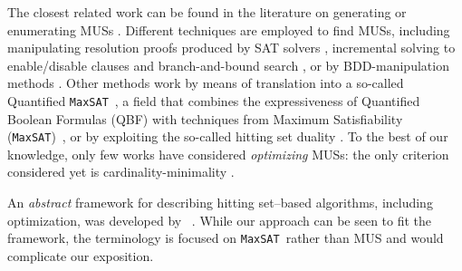 \documentclass[twoside,11pt]{article}
\newcommand\citet[1]{\citeauthor{#1}~\citeyear{#1}}
\newcommand\comment[1]{\marginpar{\tiny #1}}
\renewcommand\comment[1]{#1}
\newcommand{\emilio}[1]{{\comment{\color{red}Emilio: #1}}}
\newcommand\hitsetbased{hitting set--based\xspace} %
\newcommand\maxsat{\texttt{MaxSAT}}
\begin{document}
The closest related work can be found in the literature on generating or enumerating MUSs \cite{conf/sat/LynceM04,liffiton2016fast}.
Different techniques are employed to find MUSs, including  manipulating resolution proofs produced by SAT solvers \cite{goldberg,DBLP:journals/fmsd/GershmanKS08,DBLP:conf/sat/DershowitzHN06}, incremental solving to enable/disable clauses and branch-and-bound search \cite{DBLP:conf/dac/OhMASM04}, or by BDD-manipulation methods \cite{huang}.
Other methods work by means of translation into a so-called Quantified \maxsat~\cite{DBLP:journals/constraints/IgnatievJM16}, a field that combines the expressiveness of Quantified Boolean Formulas (QBF) \cite{QBF} with techniques from Maximum Satisfiability (\maxsat)~\cite{DBLP:series/faia/LiM09}, 
or by exploiting the so-called hitting set duality \cite{ignatiev2015smallest}.
To the best of our knowledge, only few works have considered \emph{optimizing} MUSs: the only criterion considered yet is cardinality-minimality \cite{conf/sat/LynceM04,ignatiev2015smallest}. 

An \textit{abstract} framework for describing \hitsetbased algorithms, including optimization, was developed by \citet{DBLP:conf/kr/SaikkoWJ16}. While our approach can be seen to fit the framework, the terminology is focused on \maxsat~rather than MUS and would complicate our exposition.
\end{document}
